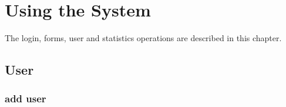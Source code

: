 \documentclass[14pt, a4paper]{article}
\begin{document}
\section{Using the System}
\begin{description}
\item The login, forms, user and statistics operations are described in this chapter.
\end{description}


\subsection{User}
	  
\subsubsection{add user}
\end{document}
